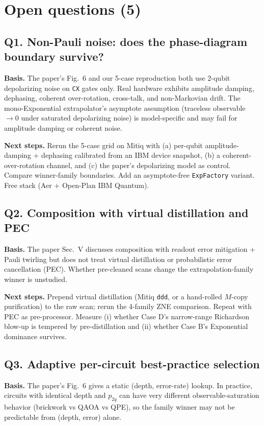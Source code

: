 \section{Open questions (5)}

\subsection*{Q1. Non-Pauli noise: does the phase-diagram boundary survive?}
\textbf{Basis.} The paper's Fig.~6 and our 5-case reproduction both use 2-qubit
depolarizing noise on \texttt{CX} gates only. Real hardware exhibits amplitude
damping, dephasing, coherent over-rotation, cross-talk, and non-Markovian drift.
The mono-Exponential extrapolator's asymptote assumption (traceless observable
$\to 0$ under saturated depolarizing noise) is model-specific and may fail for
amplitude damping or coherent noise.

\textbf{Next steps.} Rerun the 5-case grid on Mitiq with (a) per-qubit
amplitude-damping + dephasing calibrated from an IBM device snapshot,
(b) a coherent-over-rotation channel, and (c) the paper's depolarizing model as
control. Compare winner-family boundaries. Add an asymptote-free
\texttt{ExpFactory} variant. Free stack (Aer + Open-Plan IBM Quantum).

\subsection*{Q2. Composition with virtual distillation and PEC}
\textbf{Basis.} The paper Sec.~V discusses composition with readout error
mitigation + Pauli twirling but does not treat virtual distillation or
probabilistic error cancellation (PEC). Whether pre-cleaned scans change the
extrapolation-family winner is unstudied.

\textbf{Next steps.} Prepend virtual distillation (Mitiq \texttt{ddd}, or a
hand-rolled $M$-copy purification) to the raw scan; rerun the 4-family ZNE
comparison. Repeat with PEC as pre-processor. Measure (i) whether Case D's
narrow-range Richardson blow-up is tempered by pre-distillation and (ii) whether
Case B's Exponential dominance survives.

\subsection*{Q3. Adaptive per-circuit best-practice selection}
\textbf{Basis.} The paper's Fig.~6 gives a static (depth, error-rate) lookup.
In practice, circuits with identical depth and $p_{2q}$ can have very different
observable-saturation behavior (brickwork vs QAOA vs QPE), so the family winner
may not be predictable from (depth, error) alone.

